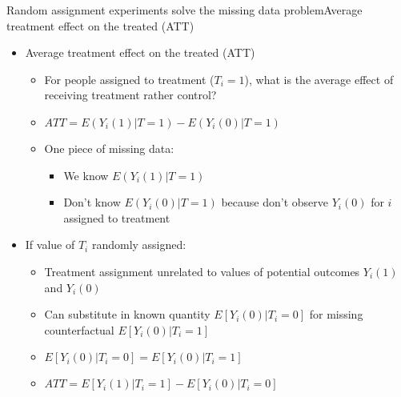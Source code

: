 \begin{frame}{Random assignment experiments solve the missing data problem}{Average treatment effect on the treated (ATT)}

	\begin{itemize}
		\item Average treatment effect on the treated (ATT)
		\begin{itemize}
			\item For people assigned to treatment ($T_i=1$), what is the average effect of receiving treatment rather control?
			\item $ ATT=E(Y_i(1)|T=1)-E(Y_i(0)|T=1) $
			\item One piece of missing data:
			\begin{itemize}
				\item We know $E(Y_i(1)|T=1)$
				\item Don't know $E(Y_i(0)|T=1) $ because don't observe $Y_i(0) $  for $i$ assigned to treatment
			\end{itemize}
		\end{itemize}
	\item If value of $T_i$ randomly assigned:
	\begin{itemize}
		\item Treatment assignment unrelated to values of potential outcomes $Y_i(1) $ and $Y_i(0)$
		\item Can substitute in known quantity $E[Y_i(0)|T_i=0]$ for missing counterfactual $E[Y_i(0)|T_i=1]$
		\item $E[Y_i(0)|T_i=0]=E[Y_i(0)|T_i=1]$
		\item  $ATT=E[Y_i(1)|T_i=1] - E[Y_i(0)|T_i=0] $
	\end{itemize}
		
	\end{itemize}
	
\end{frame}



